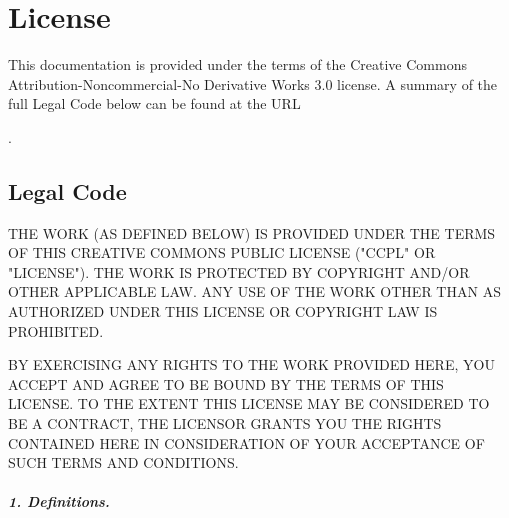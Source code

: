 \chapter*{License}


This documentation is provided under the terms of the Creative Commons Attribution-Noncommercial-No Derivative Works 3.0 license. A summary of the full Legal Code below can be found at the URL

.

\section*{Legal Code}

THE WORK (AS DEFINED BELOW) IS PROVIDED UNDER THE TERMS OF THIS CREATIVE COMMONS PUBLIC LICENSE ("CCPL" OR "LICENSE"). THE WORK IS PROTECTED BY COPYRIGHT AND/OR OTHER APPLICABLE LAW. ANY USE OF THE WORK OTHER THAN AS AUTHORIZED UNDER THIS LICENSE OR COPYRIGHT LAW IS PROHIBITED.

BY EXERCISING ANY RIGHTS TO THE WORK PROVIDED HERE, YOU ACCEPT AND AGREE TO BE BOUND BY THE TERMS OF THIS LICENSE. TO THE EXTENT THIS LICENSE MAY BE CONSIDERED TO BE A CONTRACT, THE LICENSOR GRANTS YOU THE RIGHTS CONTAINED HERE IN CONSIDERATION OF YOUR ACCEPTANCE OF SUCH TERMS AND CONDITIONS.

\paragraph{1. Definitions.}
\renewcommand{\labelenumi}{\alph{enumi}.}
\renewcommand{\labelenumii}{\roman{enumii}.}

